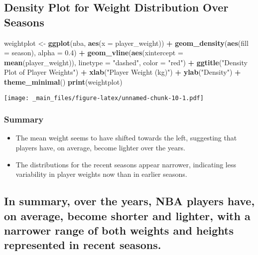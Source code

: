 \documentclass[
]{book}
\newenvironment{Shaded}{\begin{snugshade}}{\end{snugshade}}
\newcommand{\AttributeTok}[1]{\textcolor[rgb]{0.13,0.29,0.53}{#1}}
\newcommand{\FloatTok}[1]{\textcolor[rgb]{0.00,0.00,0.81}{#1}}
\newcommand{\FunctionTok}[1]{\textcolor[rgb]{0.13,0.29,0.53}{\textbf{#1}}}
\newcommand{\NormalTok}[1]{#1}
\newcommand{\OtherTok}[1]{\textcolor[rgb]{0.56,0.35,0.01}{#1}}
\newcommand{\SpecialCharTok}[1]{\textcolor[rgb]{0.81,0.36,0.00}{\textbf{#1}}}
\newcommand{\StringTok}[1]{\textcolor[rgb]{0.31,0.60,0.02}{#1}}
\providecommand{\tightlist}{%
  \setlength{\itemsep}{0pt}\setlength{\parskip}{0pt}}
\theoremstyle{definition}
\theoremstyle{definition}
\theoremstyle{definition}
\theoremstyle{definition}
\theoremstyle{remark}
\begin{document}
\hypertarget{density-plot-for-weight-distribution-over-seasons}{%
\subsection{Density Plot for Weight Distribution Over Seasons}\label{density-plot-for-weight-distribution-over-seasons}}

\begin{Shaded}
\begin{Highlighting}[]
\NormalTok{weightplot }\OtherTok{\textless{}{-}} \FunctionTok{ggplot}\NormalTok{(nba, }\FunctionTok{aes}\NormalTok{(}\AttributeTok{x =}\NormalTok{ player\_weight)) }\SpecialCharTok{+}
  \FunctionTok{geom\_density}\NormalTok{(}\FunctionTok{aes}\NormalTok{(}\AttributeTok{fill =}\NormalTok{ season), }\AttributeTok{alpha =} \FloatTok{0.4}\NormalTok{) }\SpecialCharTok{+}
  \FunctionTok{geom\_vline}\NormalTok{(}\FunctionTok{aes}\NormalTok{(}\AttributeTok{xintercept =} \FunctionTok{mean}\NormalTok{(player\_weight)), }\AttributeTok{linetype =} \StringTok{"dashed"}\NormalTok{, }\AttributeTok{color =} \StringTok{"red"}\NormalTok{) }\SpecialCharTok{+}
  \FunctionTok{ggtitle}\NormalTok{(}\StringTok{"Density Plot of Player Weights"}\NormalTok{) }\SpecialCharTok{+}
  \FunctionTok{xlab}\NormalTok{(}\StringTok{"Player Weight (kg)"}\NormalTok{) }\SpecialCharTok{+}
  \FunctionTok{ylab}\NormalTok{(}\StringTok{"Density"}\NormalTok{) }\SpecialCharTok{+}
  \FunctionTok{theme\_minimal}\NormalTok{()}
\FunctionTok{print}\NormalTok{(weightplot)}
\end{Highlighting}
\end{Shaded}

\texttt{[image: \_main\_files/figure-latex/unnamed-chunk-10-1.pdf]}

\hypertarget{summary-1}{%
\subsubsection{Summary}\label{summary-1}}

\begin{itemize}
\tightlist
\item
  The mean weight seems to have shifted towards the left, suggesting that players have, on average, become lighter over the years.
\item
  The distributions for the recent seasons appear narrower, indicating less variability in player weights now than in earlier seasons.
\end{itemize}

\hypertarget{in-summary-over-the-years-nba-players-have-on-average-become-shorter-and-lighter-with-a-narrower-range-of-both-weights-and-heights-represented-in-recent-seasons.}{%
\subsection{In summary, over the years, NBA players have, on average, become shorter and lighter, with a narrower range of both weights and heights represented in recent seasons.}\label{in-summary-over-the-years-nba-players-have-on-average-become-shorter-and-lighter-with-a-narrower-range-of-both-weights-and-heights-represented-in-recent-seasons.}}
\end{document}
